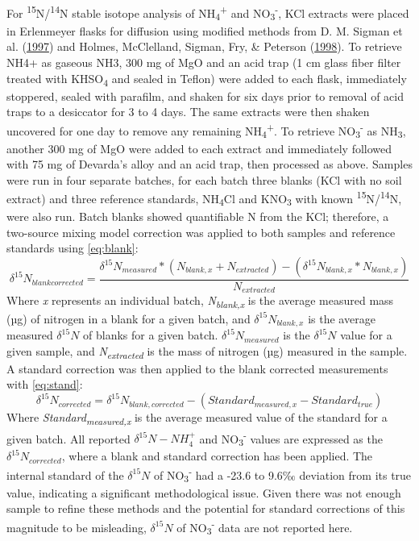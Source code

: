 \documentclass [11pt, proquest] {uwthesis}[2015/03/03]
\begin{document}
For \textsuperscript{15}N/\textsuperscript{14}N stable isotope analysis
of NH\textsubscript{4}\textsuperscript{+} and
NO\textsubscript{3}\textsuperscript{-}, KCl extracts were placed in
Erlenmeyer flasks for diffusion using modified methods from D. M. Sigman
et al. (\protect\hyperlink{ref-Sigman1997}{1997}) and Holmes,
McClelland, Sigman, Fry, \& Peterson
(\protect\hyperlink{ref-Holmes1998}{1998}). To retrieve NH4+ as gaseous
NH3, 300 mg of MgO and an acid trap (1 cm glass fiber filter treated
with KHSO\textsubscript{4} and sealed in Teflon) were added to each
flask, immediately stoppered, sealed with parafilm, and shaken for six
days prior to removal of acid traps to a desiccator for 3 to 4 days. The
same extracts were then shaken uncovered for one day to remove any
remaining NH\textsubscript{4}\textsuperscript{+}. To retrieve
NO\textsubscript{3}\textsuperscript{-} as NH\textsubscript{3}, another
300 mg of MgO were added to each extract and immediately followed with
75 mg of Devarda's alloy and an acid trap, then processed as above.
Samples were run in four separate batches, for each batch three blanks
(KCl with no soil extract) and three reference standards,
NH\textsubscript{4}Cl and KNO\textsubscript{3} with known
\textsuperscript{15}N/\textsuperscript{14}N, were also run. Batch blanks
showed quantifiable N from the KCl; therefore, a two-source mixing model
correction was applied to both samples and reference standards using
\eqref{eq:blank}:
\begin{equation} 
  \delta^{15}N_{blank corrected} =   \frac{\delta^{15}N_{measured}*(N_{blank,x} + N_{extracted}) - (\delta^{15}N_{blank,x}*N_{blank,x})}{N_{extracted}}
  \label{eq:blank}
\end{equation}
Where \emph{x} represents an individual batch,
\emph{N\textsubscript{blank,x}} is the average measured mass (µg) of
nitrogen in a blank for a given batch, and \(\delta^{15}N_{blank,x}\) is
the average measured \(\delta^{15}N\) of blanks for a given batch.
\(\delta^{15}N_{measured}\) is the \(\delta^{15}N\) value for a given
sample, and \emph{N\textsubscript{extracted}} is the mass of nitrogen
(µg) measured in the sample. A standard correction was then applied to
the blank corrected measurements with \eqref{eq:stand}:
\begin{equation} 
  \delta^{15}N_{corrected} =   \delta^{15}N_{blank,corrected}-(Standard_{measured,x} - Standard_{true})
  \label{eq:stand}
\end{equation}
Where \emph{Standard\textsubscript{measured,x}} is the average measured
value of the standard for a given batch. All reported
\(\delta^{15}N-NH_4^+\) and NO\textsubscript{3}\textsuperscript{-}
values are expressed as the \(\delta^{15}N_{corrected}\), where a blank
and standard correction has been applied. The internal standard of the
\(\delta^{15}N\) of NO\textsubscript{3}\textsuperscript{-} had a -23.6
to 9.6‰ deviation from its true value, indicating a significant
methodological issue. Given there was not enough sample to refine these
methods and the potential for standard corrections of this magnitude to
be misleading, \(\delta^{15}N\) of
NO\textsubscript{3}\textsuperscript{-} data are not reported here.
\end{document}

